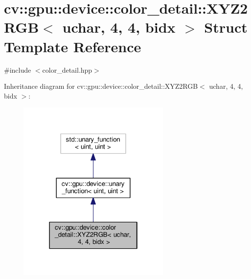 \hypertarget{structcv_1_1gpu_1_1device_1_1color__detail_1_1XYZ2RGB_3_01uchar_00_014_00_014_00_01bidx_01_4}{\section{cv\-:\-:gpu\-:\-:device\-:\-:color\-\_\-detail\-:\-:X\-Y\-Z2\-R\-G\-B$<$ uchar, 4, 4, bidx $>$ Struct Template Reference}
\label{structcv_1_1gpu_1_1device_1_1color__detail_1_1XYZ2RGB_3_01uchar_00_014_00_014_00_01bidx_01_4}
}


{\ttfamily \#include $<$color\-\_\-detail.\-hpp$>$}



Inheritance diagram for cv\-:\-:gpu\-:\-:device\-:\-:color\-\_\-detail\-:\-:X\-Y\-Z2\-R\-G\-B$<$ uchar, 4, 4, bidx $>$\-:\nopagebreak
\begin{figure}[H]
\begin{center}
\leavevmode
\includegraphics[width=214pt]{structcv_1_1gpu_1_1device_1_1color__detail_1_1XYZ2RGB_3_01uchar_00_014_00_014_00_01bidx_01_4__inherit__graph}
\end{center}
\end{figure}


